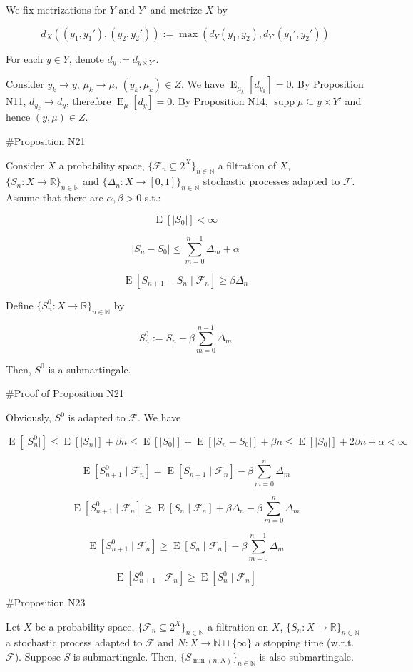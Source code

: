 \documentclass[a4paper]{article}
\DeclareMathOperator{\Supp}{supp}
\DeclareMathOperator{\E}{E}
\newcommand{\Nats}{\mathbb{N}}
\newcommand{\Reals}{\mathbb{R}}
\newcommand{\Sq}[2]{\{#1\}_{#2 \in \Nats}}
\newcommand{\Sqn}[1]{\Sq{#1}{n}}
\newcommand{\Abs}[1]{\lvert #1 \rvert}
\newcommand{\F}{\mathcal{F}}
\begin{document}
We fix metrizations for ${Y}$ and ${Y'}$ and metrize ${X}$ by 

$${d_X((y_1,y_1'),(y_2,y_2')):=\max(d_Y(y_1,y_2),d_{Y'}(y_1',y_2'))}$$

For each ${y \in Y}$, denote ${d_{y}:=d_{y \times Y'}}$.

Consider ${y_k \rightarrow y}$, ${\mu_k \rightarrow \mu}$, ${(y_k, \mu_k) \in Z}$. We have ${\E_{\mu_k}[d_{y_k}]=0}$. By Proposition N11, ${d_{y_k} \rightarrow d_y}$, therefore ${\E_\mu[d_y] = 0}$. By Proposition N14, ${\Supp \mu \subseteq y \times Y'}$ and hence ${(y,\mu) \in Z}$.

\#Proposition N21

Consider ${X}$ a probability space, ${\{\F_n \subseteq 2^X\}_{n \in \Nats}}$ a filtration of ${X}$, ${\{S_n:X \rightarrow \Reals\}_{n \in \Nats}}$ and ${\{\Delta_n:X \rightarrow [0,1]\}_{n \in \Nats}}$ stochastic processes adapted to ${\F}$. Assume that there are ${\alpha,\beta > 0}$ s.t.:

$$\E[\Abs{S_0}] < \infty$$

$$\Abs{S_{n}-S_0} \leq \sum_{m=0}^{n-1} \Delta_m + \alpha$$

$$\E[S_{n+1} - S_n \mid \F_n] \geq \beta \Delta_n$$

Define ${\Sqn{S^0_n: X \rightarrow \Reals}}$ by

$$S^0_n := S_n - \beta \sum_{m=0}^{n-1} \Delta_m$$
 
Then, ${S^0}$ is a submartingale.

\#Proof of Proposition N21

Obviously, ${S^0}$ is adapted to ${\F}$. We have

$$\E[\Abs{S^0_{n}}] \leq \E[\Abs{S_n}] + \beta n \leq \E[\Abs{S_0}] + \E[\Abs{S_n - S_0}] + \beta n \leq \E[\Abs{S_0}] + 2\beta n + \alpha < \infty$$

$$\E[S^0_{n+1} \mid \F_n] = \E[S_{n+1} \mid \F_n] - \beta \sum_{m = 0}^{n} \Delta_m$$

$$\E[S^0_{n+1} \mid \F_n] \geq \E[S_{n} \mid \F_n] + \beta \Delta_n - \beta \sum_{m = 0}^{n} \Delta_m$$

$$\E[S^0_{n+1} \mid \F_n] \geq \E[S_{n} \mid \F_n] - \beta \sum_{m = 0}^{n - 1} \Delta_m$$

$$\E[S^0_{n+1} \mid \F_n] \geq \E[S^0_{n} \mid \F_n]$$

\#Proposition N23

Let ${X}$ be a probability space, ${\Sqn{\F_n \subseteq 2^X}}$ a filtration on ${X}$, ${\Sqn{S_n: X \rightarrow \Reals}}$ a stochastic process adapted to ${\F}$ and ${N: X \rightarrow \Nats \sqcup \{\infty\}}$ a stopping time (w.r.t. ${\F}$). Suppose ${S}$ is submartingale. Then, ${\Sqn{S_{\min(n,N)}}}$ is also submartingale.
\end{document}
